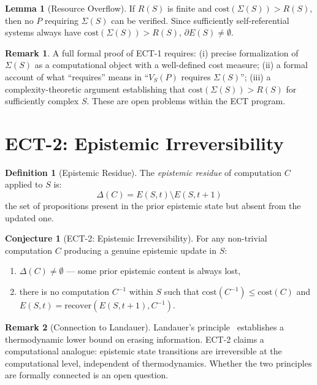 \documentclass[12pt]{article}
\theoremstyle{definition}
\newtheorem{definition}{Definition}[section]
\newtheorem{conjecture}{Conjecture}[section]
\newtheorem{lemma}{Lemma}[section]
\newtheorem{remark}{Remark}[section]
\newcommand{\ES}{E(S, t)}
\newcommand{\ESp}{E(S, t{+}1)}
\newcommand{\SM}{\Sigma(S)}
\newcommand{\EB}{\partial E(S)}
\newcommand{\VS}{V_S}
\newcommand{\RS}{R(S)}
\begin{document}
\begin{lemma}[Resource Overflow]
If $\RS$ is finite and $\mathrm{cost}(\SM) > \RS$, then no $P$ requiring $\SM$ can be verified. Since sufficiently self-referential systems always have $\mathrm{cost}(\SM) > \RS$, $\EB \neq \emptyset$.
\end{lemma}

\begin{remark}
A full formal proof of ECT-1 requires: (i) precise formalization of $\SM$ as a computational object with a well-defined cost measure; (ii) a formal account of what ``requires'' means in ``$\VS(P)$ requires $\SM$''; (iii) a complexity-theoretic argument establishing that $\mathrm{cost}(\SM) > \RS$ for sufficiently complex $S$. These are open problems within the ECT program.
\end{remark}

\section{ECT-2: Epistemic Irreversibility}
\label{sec:ect2}

\begin{definition}[Epistemic Residue]
The \emph{epistemic residue} of computation $C$ applied to $S$ is:
\[
  \Delta(C) = \ES \setminus \ESp
\]
the set of propositions present in the prior epistemic state but absent from the updated one.
\end{definition}

\begin{conjecture}[ECT-2: Epistemic Irreversibility]
\label{conj:ect2}
For any non-trivial computation $C$ producing a genuine epistemic update in $S$:
\begin{enumerate}[label=(\roman*)]
  \item $\Delta(C) \neq \emptyset$ --- some prior epistemic content is always lost,
  \item there is no computation $C^{-1}$ within $S$ such that $\mathrm{cost}(C^{-1}) \leq \mathrm{cost}(C)$ and $\ES = \mathrm{recover}(\ESp, C^{-1})$.
\end{enumerate}
\end{conjecture}

\begin{remark}[Connection to Landauer]
Landauer's principle~\cite{landauer1961} establishes a thermodynamic lower bound on erasing information. ECT-2 claims a computational analogue: epistemic state transitions are irreversible at the computational level, independent of thermodynamics. Whether the two principles are formally connected is an open question.
\end{remark}
\end{document}
